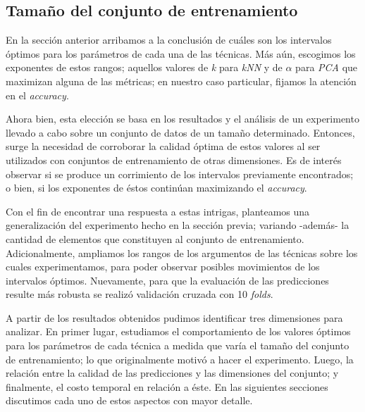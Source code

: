 \subsection{Tamaño del conjunto de entrenamiento}
En la sección anterior arribamos a la conclusión de cuáles son los intervalos óptimos para los parámetros de cada una de las técnicas. Más aún, escogimos los exponentes de estos rangos; aquellos valores de \emph{k} para \emph{kNN} y de $\alpha$ para \emph{PCA} que maximizan alguna de las métricas; en nuestro caso particular, fijamos la atención en el \emph{accuracy}. 
\par
Ahora bien, esta elección se basa en los resultados y el análisis de un experimento llevado a cabo sobre un conjunto de datos de un tamaño determinado. Entonces, surge la necesidad de corroborar la calidad óptima de estos valores al ser utilizados con conjuntos de entrenamiento de otras dimensiones. Es de interés observar si se produce un corrimiento de los intervalos previamente encontrados; o bien, si los exponentes de éstos continúan maximizando el \emph{accuracy}. 
\par
Con el fin de encontrar una respuesta a estas intrigas, planteamos una generalización del experimento hecho en la sección previa; variando -además- la cantidad de elementos que constituyen al conjunto de entrenamiento. Adicionalmente, ampliamos los rangos de los argumentos de las técnicas sobre los cuales experimentamos, para poder observar posibles movimientos de los intervalos óptimos. Nuevamente, para que la evaluación de las predicciones resulte más robusta se realizó validación cruzada con 10 \emph{folds}.
\par
A partir de los resultados obtenidos pudimos identificar tres dimensiones para analizar. En primer lugar, estudiamos el comportamiento de los valores óptimos para los parámetros de cada técnica a medida que varía el tamaño del conjunto de entrenamiento; lo que originalmente motivó a hacer el experimento. Luego, la relación entre la calidad de las predicciones y las dimensiones del conjunto; y finalmente, el costo temporal en relación a éste. En las siguientes secciones discutimos cada uno de estos aspectos con mayor detalle.
